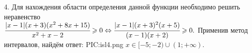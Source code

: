 4. Для нахождения области определения данной функции необходимо решить неравенство\\ $\cfrac{|x-1|(x+3)(x^2+8x+15)}{x^2+x-2}\geqslant0\Leftrightarrow
\cfrac{|x-1|(x+3)^2(x+5)}{(x-1)(x+2)}\geqslant0.$ Применив метод интервалов, найдём ответ:
{{PIC:isl4.png}}
$x\in[-5;-2)\cup(1;+\infty).$\\
